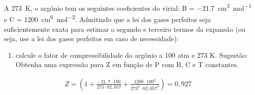 \begin{xcs}
    A \qty{273}{K}, o argônio tem os seguintes coeficientes do virial: 
    B = \qty{-21,7}{cm^3 mol^{-1}} e C = \qty{1200}{cm^6 mol^{-2}}.
    Admitindo que a lei dos gases perfeitos seja
    suficientemente exata para estimar o segundo e terceiro termos da expansão
    (ou seja, use a lei dos gases perfeitos em caso de necessidade): 
    \begin{enumerate}[label=\alph*.]
        \item calcule o fator de compressibilidade do argônio a 100 atm e 273 K.
            Sugestão: Obtenha uma expressão para Z em função de P com B, C e T
            constantes. 
    \end{enumerate}
\end{xcs}
\begin{rsl}
    \begin{align*}
        Z = (1 + \frac{-21,7 \cdot 100}{273 \cdot 82,057} + 
        \frac{1200 \cdot 100^2}{273^2 \cdot 82,057^2}) 
        = 0,927
    \end{align*}
\end{rsl}

